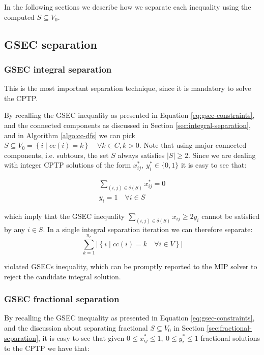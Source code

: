 In the following sections we describe how we separate each inequality using the computed $S \subseteq V_0$.

\subsection{GSEC separation}

\subsubsection{GSEC integral separation}\label{sec:gsec-integral-separation}
This is the most important separation technique, since it is mandatory to solve the CPTP.

By recalling the GSEC inequality as presented in Equation \eqref{eq:gsec-constraints}, and the connected components as discussed in Section \ref{sec:integral-separation}, and in Algorithm \ref{algo:cc-dfs} we can pick $S \subseteq V_0 = \left\{ i \mid cc(i) = k  \right\}   \quad \forall k \in C, k > 0$.
Note that using major connected components, i.e. subtours, the set $S$ always satisfies $|S| \ge 2$.
Since we are dealing with integer CPTP solutions of the form $x^*_{ij},\ y^*_{i} \in \{0, 1\}$ it is easy to see that:

\begin{align}
	\sum_{(i, j) \in \delta(S)} x^*_{ij} = 0 \\
	y_i =  1 \quad \forall i \in S
\end{align}

which imply that the GSEC inequality $\sum_{(i, j) \in \delta(S)} x_{ij} \ge 2 y_i$ cannot be satisfied by any $i \in S$.
In a single integral separation iteration we can therefore separate:
\begin{equation}
	\sum^{n_c}_{k = 1} |\left\{ i \mid cc(i) = k \quad \forall i \in V \right\}|
\end{equation}

violated GSECs inequality, which can be promptly reported to the MIP solver to reject the candidate integral solution.


\subsubsection{GSEC fractional separation}\label{sec:gsec-fractional-separation}

By recalling the GSEC inequality as presented in Equation \eqref{eq:gsec-constraints}, and the discussion about separating fractional $S \subseteq V_0$ in Section \ref{sec:fractional-separation}, it is easy to see that given $0 \le x^*_{ij} \le 1,\ 0 \le y^*_{i} \le 1$ fractional solutions to the CPTP we have that:

